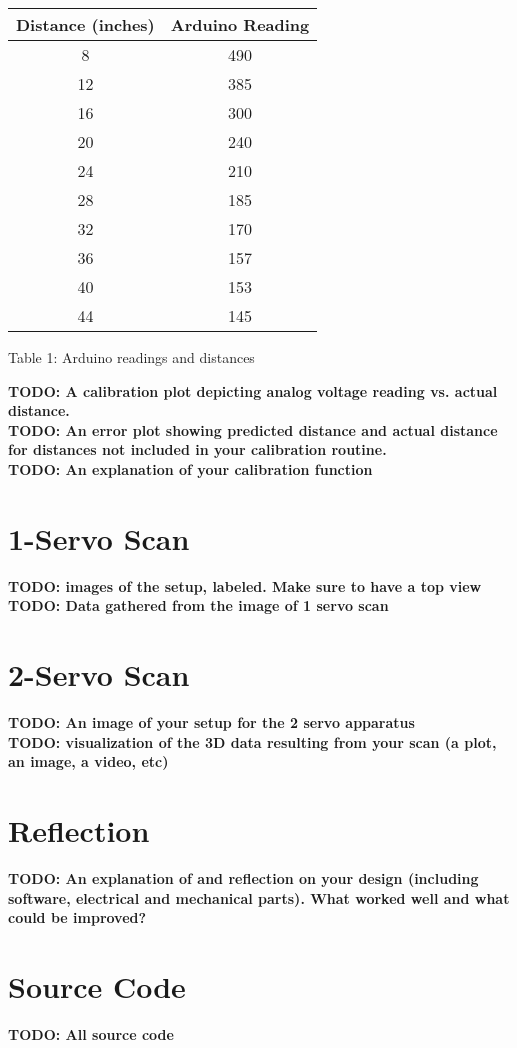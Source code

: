 \documentclass{article}
\begin{document}
    \begin{center}
    \begin{tabular}{ |c|c| } 
     \hline
     Distance (inches) & Arduino Reading \\
     \hline
     8 & 490 \\
     12 & 385 \\ 
     16 & 300 \\
     20 & 240 \\
     24 & 210 \\
     28 & 185 \\
     32 & 170 \\
     36 & 157 \\
     40 & 153 \\
     44 & 145 \\
     \hline
    \end{tabular}
    \end{center}
    Table 1: Arduino readings and distances

    
    \textbf{TODO: A calibration plot depicting analog voltage reading vs. actual distance.} \\
    \textbf{TODO: An error plot showing predicted distance and actual distance for distances not included in your calibration routine.} \\
    \textbf{TODO: An explanation of your calibration function}

\section{1-Servo Scan}
    \textbf{TODO: images of the setup, labeled. Make sure to have a top view} \\
    \textbf{TODO: Data gathered from the image of 1 servo scan} \\
    
    \section{2-Servo Scan}
    \textbf{TODO: An image of your setup for the 2 servo apparatus} \\
    \textbf{TODO: visualization of the 3D data resulting from your scan (a plot, an image, a video, etc)}

\section{Reflection}
\textbf{TODO: An explanation of and reflection on your design (including software, electrical and mechanical parts). What worked well and what could be improved?}

\section{Source Code}
\textbf{TODO: All source code}
\end{document}
